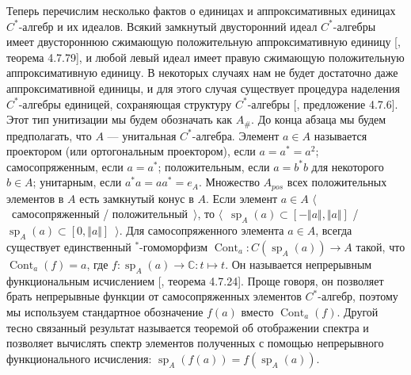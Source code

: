 Теперь перечислим несколько фактов о единицах и аппроксимативных единицах $C^*$-алгебр и их идеалов. Всякий замкнутый двусторонний идеал $C^*$-алгебры имеет двустороннюю сжимающую положительную аппроксимативную единицу [\cite{HelBanLocConvAlg}, теорема 4.7.79], и любой левый идеал  имеет правую сжимающую положительную аппроксимативную единицу. В некоторых случаях нам не будет достаточно даже аппроксимативной единицы, и для этого случая существует процедура наделения $C^*$-алгебры единицей, сохраняющая структуру $C^*$-алгебры [\cite{HelBanLocConvAlg}, предложение 4.7.6]. Этот тип унитизации мы будем обозначать как $A_\#$. До конца абзаца мы будем предполагать, что $A$ --- унитальная $C^*$-алгебра. Элемент $a\in A$ называется проектором (или ортогональным проектором), если $a=a^*=a^2$; самосопряженным, если $a=a^*$; положительным, если $a=b^*b$ для некоторого $b\in A$; унитарным, если $a^*a=aa^*=e_A$. Множество $A_{pos}$ всех положительных элементов в $A$ есть замкнутый конус в $A$. Если элемент $a\in A$ $\langle$~самосопряженный / положительный~$\rangle$, то $\langle$~$\operatorname{sp}_A(a)\subset[-\Vert a\Vert, \Vert a\Vert]$ / $\operatorname{sp}_A(a)\subset[0,\Vert a\Vert]$~$\rangle$. Для самосопряженного элемента $a\in A$, всегда существует единственный ${}^*$-гомоморфизм $\operatorname{Cont}_a:C(\operatorname{sp}_A(a))\to A$ такой, что $\operatorname{Cont}_a(f)=a$, где $f:\operatorname{sp}_A(a)\to\mathbb{C}:t\mapsto t$. Он называется непрерывным функциональным исчислением [\cite{HelBanLocConvAlg}, теорема 4.7.24]. Проще говоря, он позволяет брать непрерывные функции от самосопряженных элементов $C^*$-алгебр, поэтому мы используем стандартное обозначение $f(a)$ вместо $\operatorname{Cont}_a(f)$. Другой тесно связанный результат называется теоремой об отображении спектра и позволяет вычислять спектр элементов полученных с помощью непрерывного функционального исчисления: $\operatorname{sp}_A(f(a))=f(\operatorname{sp}_A(a))$. 

